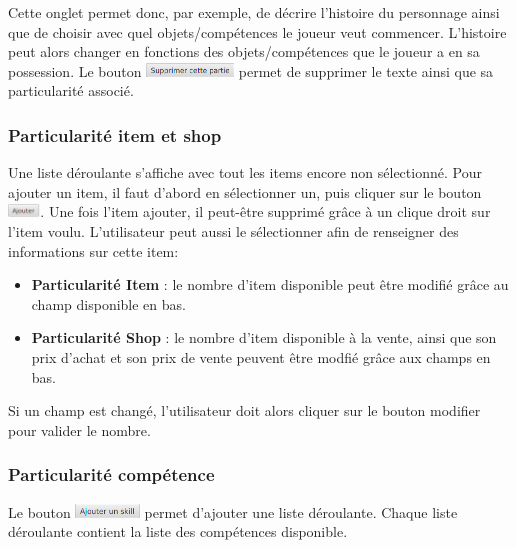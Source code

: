 			Cette onglet permet donc, par exemple, de décrire l'histoire du personnage ainsi que de choisir avec quel objets/compétences le joueur veut commencer. L'histoire peut alors changer en fonctions des objets/compétences que le joueur a en sa possession.
			Le bouton \includegraphics[height=10pt]{img/preludeSupprimerBouton.png} permet de supprimer le texte ainsi que sa particularité associé.

			\subsubsection{Particularité item et shop} \label{subsubsection:Item/Shop}
				Une liste déroulante s'affiche avec tout les items encore non sélectionné. Pour ajouter un item, il faut d'abord en sélectionner un, puis cliquer sur le bouton \includegraphics[height=10pt]{img/ajouterBouton.png}. Une fois l'item ajouter, il peut-être supprimé grâce à un clique droit sur l'item voulu.
				L'utilisateur peut aussi le sélectionner afin de renseigner des informations sur cette item:
				\begin{itemize}
					\item \textbf{Particularité Item} : le nombre d'item disponible peut être modifié grâce au champ disponible en bas.
					\item \textbf{Particularité Shop} : le nombre d'item disponible à la vente, ainsi que son prix d'achat et son prix de vente peuvent être modfié grâce aux champs en bas.
				\end{itemize}
				Si un champ est changé, l'utilisateur doit alors cliquer sur le bouton modifier pour valider le nombre.

			\subsubsection{Particularité compétence} \label{subsubsec:persoCreationSkill}
				Le bouton \includegraphics[height=10pt]{img/preludeAjouterSkillBouton.png} permet d'ajouter une liste déroulante. Chaque liste déroulante contient la liste des compétences disponible.

